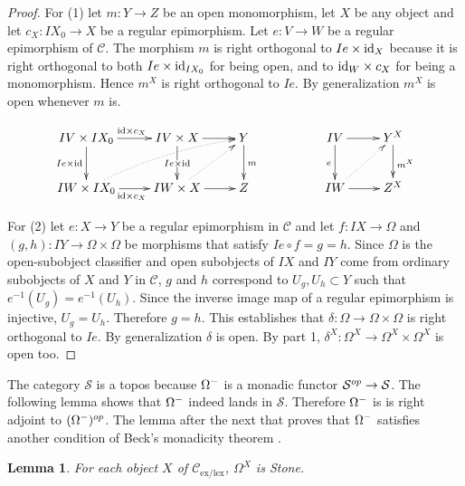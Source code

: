 \documentclass[sort&compress]{elsarticle}
\theoremstyle{plain}
\newtheorem{lemma}[theorem]{Lemma}
\theoremstyle{definition}
\theoremstyle{remark}
\newcommand\cat\mathcal
\newcommand\exlex{_\mathrm{ex/lex}}\newcommand\exreg{_\mathrm{ex/reg}}
\begin{document}
\begin{proof} For (1) let $m:Y\to Z$ be an open monomorphism, let $X$ be any object and let $c_X:IX_0 \to X$ be a regular epimorphism. Let $e:V\to W$ be a regular epimorphism of $\cat C$. The morphism $m$ is right orthogonal to $Ie\times \mathrm{id}_X$ because it is right orthogonal to both $Ie\times \mathrm{id}_{IX_0}$ for being open, and to $\mathrm{id}_{W}\times c_X$ for being a monomorphism. Hence $m^X$ is right orthogonal to $Ie$. By generalization $m^X$ is open whenever $m$ is.

\[\xymatrix{
IV\times IX_0 \ar[d]_{Ie\times \id} \ar[r]^{\id\times c_X} & IV\times X \ar[r] \ar[d]|{Ie\times \id} & Y\ar[d]^m && IV \ar[d]_e\ar[r] & Y^X \ar[d]^{m^X} \\
IW\times IX_0 \ar[r]_{\id\times c_X}\ar@{.>}@/^/[urr] & IW\times X \ar[r]\ar@{.>}[ur] & Z && IW\ar[r]\ar@{.>}[ur] & Z^X
}\]

For (2) let $e:X\to Y$ be a regular epimorphism in $\cat C$ and let $f:IX\to \Omega$ and $(g,h):IY\to \Omega\times \Omega$ be morphisms that satisfy $Ie\circ f = g = h$. Since $\Omega$ is the open-subobject classifier and open subobjects of $IX$ and $IY$ come from ordinary subobjects of $X$ and $Y$ in $\cat C$, $g$ and $h$ correspond to $U_g,U_h\subset Y$ such that $e^{-1}(U_g) = e^{-1}(U_h)$. Since the inverse image map of a regular epimorphism is injective, $U_g=U_h$. Therefore $g=h$. This establishes that $\delta:\Omega\to \Omega\times \Omega$ is right orthogonal to $Ie$. By generalization $\delta$ is open. By part 1, $\delta^X: \Omega^X \to \Omega^X\times \Omega^X$ is open too.
\end{proof}

The category $\cat S$ is a topos because $\Omega^-$ is a monadic functor $\cat S\dual\to\cat S$. The following lemma shows that $\Omega^-$ indeed lands in $\cat S$. Therefore $\Omega^-$ is is right adjoint to $(\Omega^-)^{op}$. The lemma after the next that proves that $\Omega^-$ satisfies another condition of Beck's monadicity theorem \citep[VI.7]{MR0354798}.


\begin{lemma} For each object $X$ of $\cat C\exlex$, $\Omega^X$ is Stone.\end{lemma}
\end{document}
